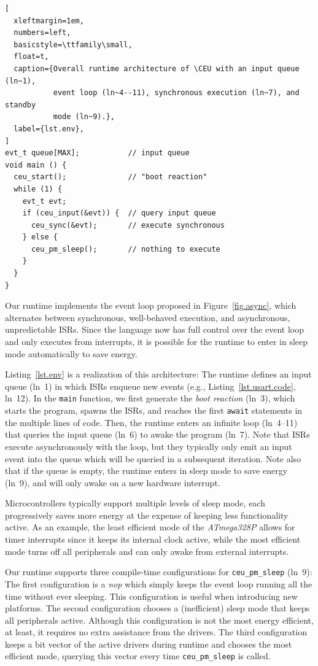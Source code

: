 \documentclass[sigplan,10pt,review,anonymous]{acmart}\settopmatter{printfolios=true,printccs=false,printacmref=false}
\newcommand{\CEU}{\textsc{C\'{e}u}\xspace}
\newcommand{\code}[1] {{\small{\texttt{#1}}}}
\begin{document}
\begin{lstlisting}[
  xleftmargin=1em,
  numbers=left,
  basicstyle=\ttfamily\small,
  float=t,
  caption={Overall runtime architecture of \CEU with an input queue (ln~1),
           event loop (ln~4--11), synchronous execution (ln~7), and standby
           mode (ln~9).},
  label={lst.env},
]
evt_t queue[MAX];           // input queue
void main () {
  ceu_start();              // "boot reaction"
  while (1) {
    evt_t evt;
    if (ceu_input(&evt)) {  // query input queue
      ceu_sync(&evt);       // execute synchronous
    } else {
      ceu_pm_sleep();       // nothing to execute
    }
  }
}
\end{lstlisting}

Our runtime implements the event loop proposed in Figure~\ref{fig.async}, which
alternates between synchronous, well-behaved execution, and asynchronous,
unpredictable ISRs.
%
Since the language now has full control over the event loop and only executes
from interrupts, it is possible for the runtime to enter in sleep mode
automatically to save energy.

Listing~\ref{lst.env} is a realization of this architecture:
%
The runtime defines an input queue (ln~1) in which ISRs enqueue new events
(e.g., Listing~\ref{lst.usart.code}, ln~12).
%
In the \code{main} function, we first generate the \emph{boot reaction} (ln~3),
which starts the program, spawns the ISRs, and reaches the first \code{await}
statements in the multiple lines of code.
%
Then, the runtime enters an infinite loop (ln~4--11) that queries the input
queue (ln~6) to awake the program (ln~7).
%
Note that ISRs execute asynchronously with the loop, but they typically only
emit an input event into the queue which will be queried in a subsequent
iteration.
%
Note also that if the queue is empty, the runtime enters in sleep mode to save
energy (ln~9), and will only awake on a new hardware interrupt.

Microcontrollers typically support multiple levels of sleep mode, each
progressively saves more energy at the expense of keeping less functionality
active.
%
As an example, the least efficient mode of the \emph{ATmega328P} allows for
timer interrupts since it keeps its internal clock active, while the most
efficient mode turns off all peripherals and can only awake from external
interrupts.

Our runtime supports three compile-time configurations for \code{ceu\_pm\_sleep}
(ln~9):
%
The first configuration is a \emph{nop} which simply keeps the event loop
running all the time without ever sleeping.
This configuration is useful when introducing new platforms.
%
The second configuration chooses a (inefficient) sleep mode that keeps all
peripherals active.
Although this configuration is not the most energy efficient, at least, it
requires no extra assistance from the drivers.
%
The third configuration keeps a bit vector of the active drivers during runtime
and chooses the most efficient mode, querying this vector every time
\code{ceu\_pm\_sleep} is called.
\end{document}

